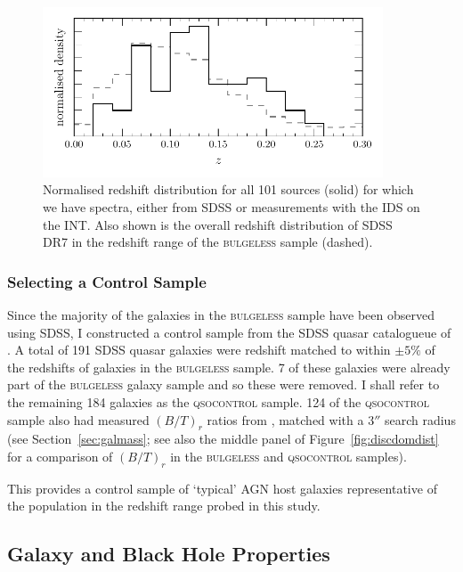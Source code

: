 \begin{figure}
\centering
\includegraphics[width=0.9\textwidth]{agn/z_distribution_101_sdss.pdf}
\caption[Redshift distribution of the \textsc{bulgeless} sample]{Normalised redshift distribution for all 101 sources (solid) for which we have spectra, either from SDSS or measurements with the IDS on the INT. Also shown is the overall redshift distribution of SDSS DR7 in the redshift range of the \textsc{bulgeless} sample (dashed).
}
\label{fig:redshifts}
\end{figure}

\subsubsection{Selecting a Control Sample}

Since the majority of the galaxies in the \textsc{bulgeless} sample have been observed using SDSS, I constructed a control sample from the SDSS quasar catalogueue of \citet{shen11}. A total of 191 SDSS quasar galaxies were redshift matched to within $\pm5\%$ of the redshifts of galaxies in the \textsc{bulgeless} sample. 7 of these galaxies were already part of the \textsc{bulgeless} galaxy sample and so these were removed.  I shall refer to the remaining 184 galaxies as the \textsc{qsocontrol} sample. 124 of the \textsc{qsocontrol} sample also had measured $(B/T)_r$ ratios from \citet[][]{simard11}, matched with a $3''$ search radius (see Section~\ref{sec:galmass}; see also the middle panel of Figure~\ref{fig:discdomdist} for a comparison of $(B/T)_r$ in the \textsc{bulgeless} and \textsc{qsocontrol} samples). 

This provides a control sample of `typical' AGN host galaxies representative of the population in the redshift range probed in this study. 

%
%
\subsection{Galaxy and Black Hole Properties}\label{sec:masses}
%
%

